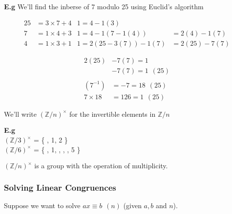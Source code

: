 \documentclass[11pt]{article}
\begin{document}
	\begin{flushleft}
		\textbf{E.g} We'll find the inberse of 7 modulo 25 using Euclid's algorithm

		\begin{align*}
			25 &= 3\times7 + 4   &1=4-1(3) \hspace{15pt}\\
			7 &= 1\times4 + 3    &1= 4-1(7-1(4))&=2(4)-1(7)\\
			4&= 1\times3+1	     &1 = 2(25-3(7)) - 1(7) &= 2(25) - 7(7)
		\end{align*}

		\begin{align*}
			2(25) &- 7(7) = 1 \\
			&-7(7) = 1 \hspace{5pt}(25) \\
			\\(7^{-1}) &= -7= 18 \hspace{5pt} (25) \\
			7\times 18 &= 126 = 1 \hspace{5pt} (25) 
		\end{align*}
	\end{flushleft}

	We'll write $(\mathbb{Z}/n)^{\times}$ for the invertible elements in $\mathbb{Z}/n $\\
\begin{flushleft}
		\textbf{E.g} \\ $(\mathbb{Z}/3)^{\times}$ = \{ , 1, 2 \}\\ 
			$(\mathbb{Z}/6)^{\times}$ = \{ , 1, , , , 5 \} 


\end{flushleft}


\begin{theorem}
	$(\mathbb{Z}/n)^{\times}$ is a group with the operation of multiplicity.
\end{theorem}

	
	
	\subsubsection{Solving Linear Congruences}

Suppose we want to solve $ax\equiv b \hspace{5pt} (n)$ (given $a,b$ and $n$).
\end{document}
